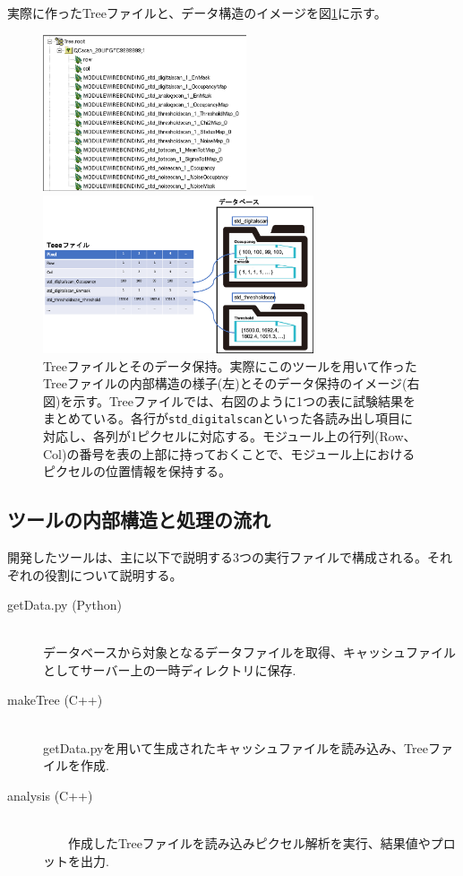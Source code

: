 実際に作ったTreeファイルと、データ構造のイメージを図\ref{analysis_tool_tree}に示す。

\begin{figure}[bpt]
  \begin{center}
  \begin{minipage}{0.4\hsize}
    \includegraphics[width=6cm]{analysis_tool_tree_file}
  \end{minipage}
  \begin{minipage}{0.4\hsize}
    \includegraphics[width=8cm]{analysis_tool_tree_image}
  \end{minipage}
  \caption[Treeファイルとそのデータ保持]{Treeファイルとそのデータ保持。実際にこのツールを用いて作ったTreeファイルの内部構造の様子(左)とそのデータ保持のイメージ(右図)を示す。Treeファイルでは、右図のように1つの表に試験結果をまとめている。各行が\texttt{std$\_$digitalscan}といった各読み出し項目に対応し、各列が1ピクセルに対応する。モジュール上の行列(Row、Col)の番号を表の上部に持っておくことで、モジュール上におけるピクセルの位置情報を保持する。}
  \label{analysis_tool_tree}
  \end{center}
\end{figure}

\clearpage
\subsection{ツールの内部構造と処理の流れ}
開発したツールは、主に以下で説明する3つの実行ファイルで構成される。それぞれの役割について説明する。

\begin{description}
  \item[getData.py (Python)]\mbox{}\\ 
    データベースから対象となるデータファイルを取得、キャッシュファイルとしてサーバー上の一時ディレクトリに保存.
  \item[makeTree (C++)]\mbox{}\\ 
    getData.pyを用いて生成されたキャッシュファイルを読み込み、Treeファイルを作成.
  \item[analysis (C++)]\mbox{}\\ 
　　作成したTreeファイルを読み込みピクセル解析を実行、結果値やプロットを出力.
\end{description}

